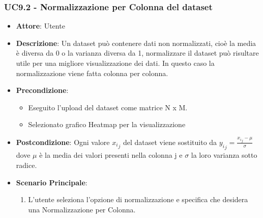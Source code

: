     \subsubsection{UC9.2 - Normalizzazione per Colonna del dataset}
    \label{uc9.2}
    \begin{itemize}
    \item \textbf{Attore}: Utente
    \item \textbf{Descrizione}: Un dataset può contenere dati non normalizzati, cioè la media è diversa da 0 o la varianza diversa da 1, normalizzare il dataset può risultare utile per una migliore visualizzazione dei dati.
    In questo caso la normalizzazione viene fatta colonna per colonna.
    \item \textbf{Precondizione}: 
    \begin{itemize}
        \item Eseguito l'upload del dataset come matrice N x M.
        \item Selezionato grafico Heatmap per la visualizzazione
    \end{itemize}  
    \item \textbf{Postcondizione}: Ogni valore \({x_i}_j\) del dataset viene sostituito da \( {y_i}_j = \frac{{x_i}_j - \mu}{\sigma}\) dove \(\mu\) è la media dei valori presenti nella colonna j e \(\sigma\) la loro varianza sotto radice.
    \item \textbf{Scenario Principale}: 
    \begin{enumerate}
        \item L'utente seleziona l'opzione di normalizzazione e specifica che desidera una Normalizzazione per Colonna. 
    \end{enumerate}  
    \end{itemize}
    
